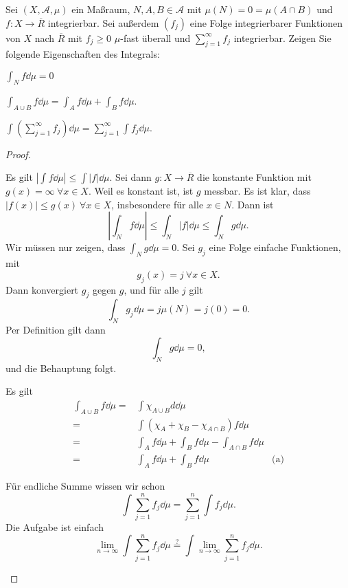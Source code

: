 \begin{Problem}\label{pr:advanalblatt6-2}
	Sei $(X,\mathcal{A},\mu)$ ein Maßraum, $N,A,B\in \mathcal{A}$ mit $\mu(N)=0=\mu(A\cap B)$ und $f:X\to \overline{R}$ integrierbar. Sei außerdem $(f_j)$ eine Folge integrierbarer Funktionen von $X$ nach $\overline{R}$ mit $f_j\ge 0$ $\mu$-fast überall und $\sum_{j=1}^{\infty} f_j$ integrierbar. Zeigen Sie folgende Eigenschaften des Integrals:
	\begin{parts}
	\item $\int_N f\dd{\mu}=0$
	\item $\int_{A\cup B}f\dd{\mu}=\int_A f\dd{\mu}+\int_B f\dd{\mu}$.
	\item $\int \left( \sum_{j=1}^{\infty} f_j \right) \dd{\mu}=\sum_{j=1}^{\infty} \int f_j\dd{\mu}$.
	\end{parts}
\end{Problem}
\begin{proof}
	\begin{parts}
	\item Es gilt $\left| \int f\dd{\mu} \right| \le \int |f|\dd{\mu}$. Sei dann $g:X\to \overline{R}$ die konstante Funktion mit $g(x)=\infty~\forall x\in X$. Weil es konstant ist, ist $g$ messbar. Es ist klar, dass $|f(x)|\le g(x)~\forall x\in X$, insbesondere für alle $x\in N$. Dann ist
		\[
			\left| \int_N f\dd{\mu} \right| \le \int_N |f|\dd{\mu}\le \int_N g\dd{\mu}
		.\] 
		Wir müssen nur zeigen, dass $\int_N g\dd{\mu}=0$. Sei $g_j$ eine Folge einfache Funktionen, mit
		\[
		g_j(x)=j~\forall x\in X
		.\] 
		Dann konvergiert $g_j$ gegen $g$, und f\"{u}r alle $j$ gilt
		\[
			\int_N g_j\dd{\mu}=j\mu(N)=j(0)=0
		.\] 
		Per Definition gilt dann
		\[
			\int_N g\dd{\mu}=0
		,\] 
		und die Behauptung folgt.
	\item Es gilt
		\begin{align*}
			\int_{A\cup B}f\dd{\mu}=& \int \chi_{A\cup B}d\dd{\mu}\\
			=& \int\left( \chi_A+\chi_B-\chi_{A\cap B} \right) f\dd{\mu}\\
			=& \int_A f\dd{\mu}+\int_B f\dd{\mu}-\int_{A\cap B}f\dd{\mu}\\
			=&\int_A f\dd{\mu}+\int_B f\dd{\mu} & \text{(a)}
		\end{align*}
	\item Für endliche Summe wissen wir schon
		\[
			\int \sum_{j=1}^{n} f_j\dd{\mu}=\sum_{j=1}^{n} \int f_j\dd{\mu} 
		.\] 
		Die Aufgabe ist einfach
		\[
			\lim_{n \to \infty} \int \sum_{j=1}^{n} f_j\dd{\mu}\overset{?}{=}\int \lim_{n \to \infty} \sum_{j=1}^n f_j\dd{\mu}
		.\] 
	\end{parts}
\end{proof}

